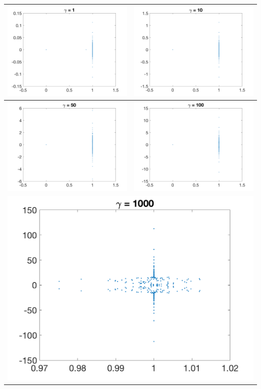 \documentclass[11pt]{article}
\theoremstyle{definition}
\theoremstyle{remark}
\theoremstyle{plain}
\begin{document}
\endgroup
\begin{center}
  \begin{tabular}{|c|c|}
    \hline
    \includegraphics[width=0.45\linewidth]{../Figures/homework5_4_1.png}&\includegraphics[width=0.45\linewidth]{../Figures/homework5_4_10.png}\\\hline
    \includegraphics[width=0.45\linewidth]{../Figures/homework5_4_50.png}&\includegraphics[width=0.45\linewidth]{../Figures/homework5_4_100.png}\\\hline
    \multicolumn{2}{|c|}{\includegraphics[width=0.45\linewidth]{../Figures/homework5_4_1000.png}}\\\hline
  \end{tabular}
\end{center}\newpage
\end{document}
